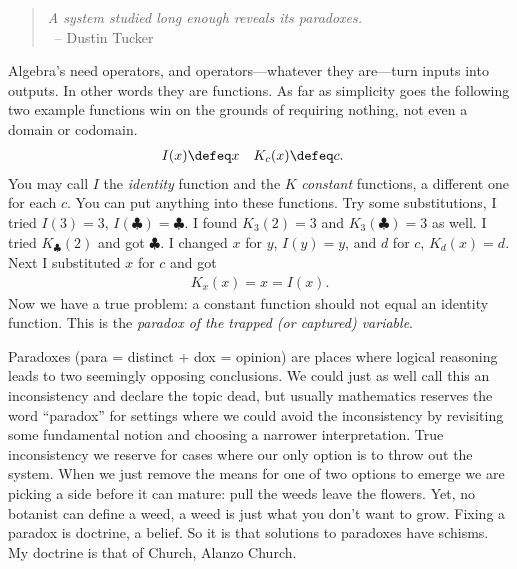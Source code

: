 \begin{quote}
\emph{A system studied long enough reveals its paradoxes.}\\
~\hfill-- Dustin Tucker
\end{quote}
Algebra's need operators, and operators---whatever they are---turn 
inputs into outputs.  In other words they are functions.  
As far as simplicity goes the following two example functions win 
on the grounds of requiring nothing, not even a domain or codomain.
\begin{align*}
    I(x) & \defeq x & 
    K_c(x) & \defeq c.
\end{align*}
You may call $I$ the \emph{identity} function and the $K$ \emph{constant} functions,
a different one for each $c$.  You can put anything into these functions.
Try some substitutions, I tried $I(3)=3$, $I(\clubsuit)=\clubsuit$.
I found $K_3(2)=3$ and $K_3(\clubsuit)=3$ as well.  I tried 
$K_{\clubsuit}(2)$ and got $\clubsuit$.  I changed $x$ for $y$, 
$I(y)=y$, and $d$ for $c$, $K_d(x)=d$. Next I substituted $x$ for $c$ and got
\begin{align*}
    K_x(x)=x=I(x).
\end{align*}
Now we have a true problem: a constant function should not equal 
an identity function.  This is the \emph{paradox of the trapped (or captured) variable}.

Paradoxes (para = distinct + dox = opinion) are places where logical reasoning
leads to two seemingly opposing conclusions.  We could just as well call this an
inconsistency and declare the topic dead, but usually mathematics reserves the
word ``paradox'' for settings where we could avoid the inconsistency by revisiting
some fundamental notion and choosing a narrower interpretation.  True
inconsistency we reserve for cases where our only option is to throw out the
system.  When we just remove the means for one of two options to 
emerge we are picking a side before it can mature: pull the weeds leave the flowers.
Yet, no botanist can define a weed, a weed is just what you don't want to grow.
Fixing a paradox is doctrine, a belief.  So it 
is that solutions to paradoxes have schisms.  My doctrine is that of Church,
Alanzo Church.\Church

